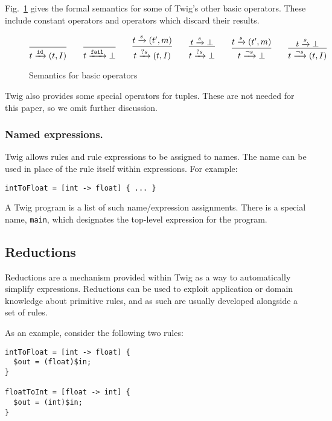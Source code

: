Fig.~\ref{fig:twig-basic} gives the formal semantics for some of Twig's other basic operators. These include constant operators and operators which discard their results.

\begin{figure}[ht]
\[
\infer{t \arr{\mathtt{id}} (t,I)}{}
\qquad
\infer{t \arr{\mathtt{fail}} \bot}{}
\qquad
\infer{t \arr{?s} (t,I)}{t \arr{s} (t',m)}
\qquad 
\infer{t \arr{?s} \bot}{t \arr{s} \bot}
\qquad
\infer{t \arr{\lnot s} \bot}{t \arr{s} (t',m)}
\qquad 
\infer{t \arr{\lnot s} (t,I)}{t \arr{s} \bot}
\]
\caption{Semantics for basic operators}
\label{fig:twig-basic}
\end{figure}

Twig also provides some special operators for tuples. These are not needed for this paper, so we omit further discussion.

\subsubsection{Named expressions.}
\label{sec:names}

Twig allows rules and rule expressions to be assigned to names. The name can be used in place of the rule itself within expressions. For example:

\begin{verbatim}
intToFloat = [int -> float] { ... }
\end{verbatim}

A Twig program is a list of such name/expression assignments. There is a special name, \texttt{main}, which designates the top-level expression for the program.

\subsection{Reductions}
\label{sec:reductions}

Reductions are a mechanism provided within Twig as a way to automatically simplify expressions. Reductions can be used to exploit application or domain knowledge about primitive rules, and as such are usually developed alongside a set of rules.

As an example, consider the following two rules:

\begin{verbatim}
intToFloat = [int -> float] {
  $out = (float)$in;
}

floatToInt = [float -> int] {
  $out = (int)$in;
}
\end{verbatim}

